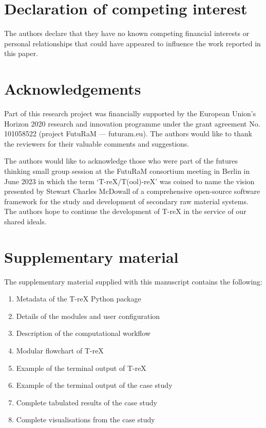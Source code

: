\documentclass[a4paper,fleqn]{cas-dc}
\begin{document}
\section*{Declaration of competing interest}
The authors declare that they have no known competing financial interests or personal relationships that could have appeared to influence the work reported in this paper.

\section*{Acknowledgements}
Part of this research project was financially supported by the European Union's Horizon 2020 research and innovation programme under the grant agreement No. 101058522 (project FutuRaM --- futuram.eu). The authors would like to thank the reviewers for their valuable comments and suggestions.

The authors would like to acknowledge those who were part of the futures thinking small group session at the FutuRaM consortium meeting in Berlin in June 2023 in which the term `T-reX/T(ool)-reX' was coined to name the vision presented by Stewart Charles McDowall of a comprehensive open-source software framework for the study and development of secondary raw material systems. The authors hope to continue the development of T-reX in the service of our shared ideals.

\section{Supplementary material}\label{sec:supplementary}
The supplementary material supplied with this manuscript contains the following:
\begin{enumerate}
	\item Metadata of the T-reX Python package
	\item Details of the modules and user configuration
	\item Description of the computational workflow
	\item Modular flowchart of T-reX
	\item Example of the terminal output of T-reX
	\item Example of the terminal output of the case study
	\item Complete tabulated results of the case study
	\item Complete visualisations from the case study
\end{enumerate}

%



\end{document}
